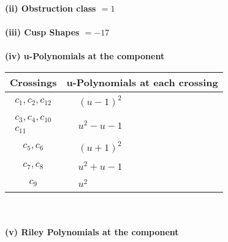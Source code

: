 \documentclass[1p]{elsarticle_modified}
\theoremstyle{definition}
\begin{document}
\flushleft \textbf{(ii) Obstruction class $= 1$}\\~\\
\flushleft \textbf{(iii) Cusp Shapes $= -17$}\\~\\
\newpage\renewcommand{\arraystretch}{1}
\flushleft \textbf{(iv) u-Polynomials at the component}\newline \\
\begin{tabular}{m{50pt}|m{274pt}}
Crossings & \hspace{64pt}u-Polynomials at each crossing \\
\hline $$\begin{aligned}c_{1},c_{2},c_{12}\end{aligned}$$&$\begin{aligned}
&(u-1)^2
\end{aligned}$\\
\hline $$\begin{aligned}c_{3},c_{4},c_{10}\\c_{11}\end{aligned}$$&$\begin{aligned}
&u^2- u-1
\end{aligned}$\\
\hline $$\begin{aligned}c_{5},c_{6}\end{aligned}$$&$\begin{aligned}
&(u+1)^2
\end{aligned}$\\
\hline $$\begin{aligned}c_{7},c_{8}\end{aligned}$$&$\begin{aligned}
&u^2+u-1
\end{aligned}$\\
\hline $$\begin{aligned}c_{9}\end{aligned}$$&$\begin{aligned}
&u^2
\end{aligned}$\\
\hline
\end{tabular}\\~\\
\newpage\renewcommand{\arraystretch}{1}
\flushleft \textbf{(v) Riley Polynomials at the component}\newline \\
\end{document}
